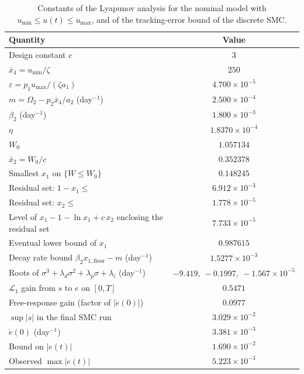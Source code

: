 \begin{table}[htbp]
\centering
\caption{Constants of the Lyapunov analysis for the nominal model with $u_{\min}\le u(t)\le u_{\max}$, and of the tracking-error bound of the discrete SMC.}
\label{tab:lyapunov}
\small
\begin{tabular}{lc}
\toprule
Quantity & Value \\
\midrule
Design constant $c$ & $3$ \\
$\bar{x}_4=u_{\min}/\zeta$ & $250$ \\
$\varepsilon=p_1u_{\max}/(\zeta a_1)$ & $4.700{\times}10^{-5}$ \\
$m=\Omega_2-p_2\bar{x}_4/a_2$ (day$^{-1}$) & $2.500{\times}10^{-4}$ \\
$\beta_2$ (day$^{-1}$) & $1.800{\times}10^{-3}$ \\
$\eta$ & $1.8370{\times}10^{-4}$ \\
$W_0$ & $1.057134$ \\
$\bar{x}_2=W_0/c$ & $0.352378$ \\
Smallest $x_1$ on $\{W\le W_0\}$ & $0.148245$ \\
Residual set: $1-x_1\le$ & $6.912{\times}10^{-3}$ \\
Residual set: $x_2\le$ & $1.778{\times}10^{-5}$ \\
Level of $x_1-1-\ln x_1+c\,x_2$ enclosing the residual set & $7.733{\times}10^{-5}$ \\
Eventual lower bound of $x_1$ & $0.987615$ \\
Decay rate bound $\beta_2x_{1,\mathrm{floor}}-m$ (day$^{-1}$) & $1.5277{\times}10^{-3}$ \\
Roots of $\sigma^3+\lambda_d\sigma^2+\lambda_p\sigma+\lambda_i$ (day$^{-1}$) & $-9.419,\ -0.1997,\ -1.567{\times}10^{-5}$ \\
$\mathcal{L}_1$ gain from $s$ to $e$ on $[0,T]$ & $0.5471$ \\
Free-response gain (factor of $|\dot e(0)|$) & $0.0977$ \\
$\sup|s|$ in the final SMC run & $3.029{\times}10^{-2}$ \\
$\dot e(0)$ (day$^{-1}$) & $3.381{\times}10^{-3}$ \\
Bound on $|e(t)|$ & $1.690{\times}10^{-2}$ \\
Observed $\max|e(t)|$ & $5.223{\times}10^{-3}$ \\
\bottomrule
\end{tabular}
\end{table}
